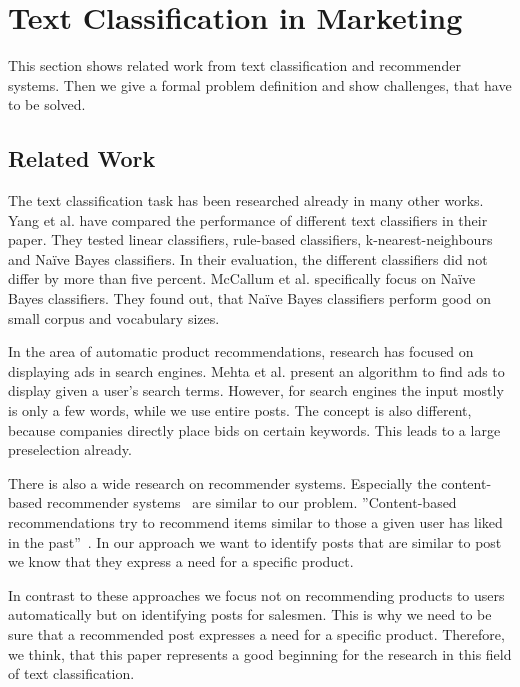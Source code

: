 
\section{Text Classification in Marketing}
\label{sec:background}

This section shows related work from text classification and recommender systems.
Then we give a formal problem definition and show challenges, that have to be solved.

\subsection{Related Work}
The text classification task has been researched already in many other works.
Yang et al.\cite{yang1999re} have compared the performance of different text classifiers in their paper.
They tested linear classifiers, rule-based classifiers, k-nearest-neighbours and Na\"ive Bayes classifiers.
In their evaluation, the different classifiers did not differ by more than five percent.
McCallum et al. \cite{mccallum1998comparison} specifically focus on Na\"ive Bayes classifiers.
They found out, that Na\"ive Bayes classifiers perform good on small corpus and vocabulary sizes.

In the area of automatic product recommendations, research has focused on displaying ads in search engines.
Mehta et al.\cite{mehta2007adwords} present an algorithm to find ads to display given a user's search terms.
However, for search engines the input mostly is only a few words, while we use entire posts.
The concept is also different, because companies directly place bids on certain keywords.
This leads to a large preselection already.

There is also a wide research on recommender systems. 
Especially the content-based recommender systems~\cite{lops2011content} are similar to our problem.
''Content-based recommendations try to recommend items similar to those a given user has liked in the past''~\cite{lops2011content}.
In our approach we want to identify posts that are similar to post we know that they express a need for a specific product.


In contrast to these approaches we focus not on recommending products to users automatically but on identifying posts for salesmen.
This is why we need to be sure that a recommended post expresses a need for a specific product.
Therefore, we think, that this paper represents a good beginning for the research in this field of text classification.


